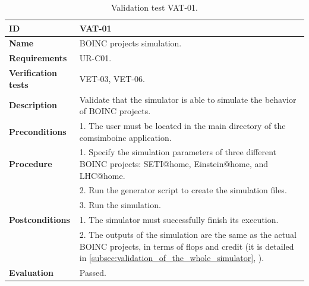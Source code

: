\begin{center}
\begin{table}[htb]
\centering
\begin{tabular}{@{}p{2.5cm} p{13cm}@{}} 
\toprule
\textbf{ID} 					& VAT-01 \\
\midrule
\textbf{Name} 				& BOINC projects simulation. \\
\midrule
\textbf{Requirements} 		& UR-C01. \\
\midrule
\textbf{Verification tests} 	& VET-03, VET-06. \\
\midrule
\textbf{Description} 		& Validate that the simulator is able to simulate the behavior of BOINC projects. \\
\midrule
\textbf{Preconditions}		&  1. The user must be located in the main directory of the \gls{comsimboinc} application. \\
\midrule
\textbf{Procedure}			& 1. Specify the simulation parameters of three different BOINC projects: SETI@home, Einstein@home, and LHC@home. \\
							& 2. Run the generator script to create the simulation files. \\
							& 3. Run the simulation. \\ 
\midrule
\textbf{Postconditions} 		& 1. The simulator must successfully finish its execution. \\
							& 2. The outputs of the simulation are the same as the actual BOINC projects, in terms of \acrshort{flops} and credit (it is detailed in \ref{subsec:validation_of_the_whole_simulator}, \textit{\nameref{subsec:validation_of_the_whole_simulator}}). \\
\midrule
\textbf{Evaluation} 			& Passed. \\
\bottomrule
\end{tabular}
\caption{Validation test VAT-01.}
\label{tab:vat-01}
\end{table}
\end{center}



